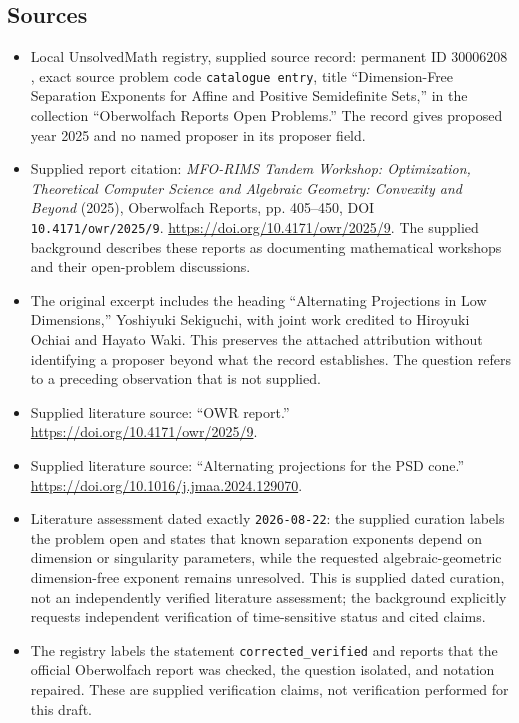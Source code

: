 \documentclass[11pt]{article}
\begin{document}
\subsection{Sources}
\begin{itemize}
\item Local UnsolvedMath registry, supplied source record: permanent ID \(30006208\), exact source problem code \texttt{catalogue entry}, title ``Dimension-Free Separation Exponents for Affine and Positive Semidefinite Sets,'' in the collection ``Oberwolfach Reports Open Problems.'' The record gives proposed year 2025 and no named proposer in its proposer field.
\item Supplied report citation: \emph{MFO-RIMS Tandem Workshop: Optimization, Theoretical Computer Science and Algebraic Geometry: Convexity and Beyond} (2025), Oberwolfach Reports, pp. 405--450, DOI \texttt{10.4171/owr/2025/9}. \url{https://doi.org/10.4171/owr/2025/9}. The supplied background describes these reports as documenting mathematical workshops and their open-problem discussions.
\item The original excerpt includes the heading ``Alternating Projections in Low Dimensions,'' Yoshiyuki Sekiguchi, with joint work credited to Hiroyuki Ochiai and Hayato Waki. This preserves the attached attribution without identifying a proposer beyond what the record establishes. The question refers to a preceding observation that is not supplied.
\item Supplied literature source: ``OWR report.'' \url{https://doi.org/10.4171/owr/2025/9}.
\item Supplied literature source: ``Alternating projections for the PSD cone.'' \url{https://doi.org/10.1016/j.jmaa.2024.129070}.
\item Literature assessment dated exactly \texttt{2026-08-22}: the supplied curation labels the problem open and states that known separation exponents depend on dimension or singularity parameters, while the requested algebraic-geometric dimension-free exponent remains unresolved. This is supplied dated curation, not an independently verified literature assessment; the background explicitly requests independent verification of time-sensitive status and cited claims.
\item The registry labels the statement \texttt{corrected\_verified} and reports that the official Oberwolfach report was checked, the question isolated, and notation repaired. These are supplied verification claims, not verification performed for this draft.
\end{itemize}
\end{document}
